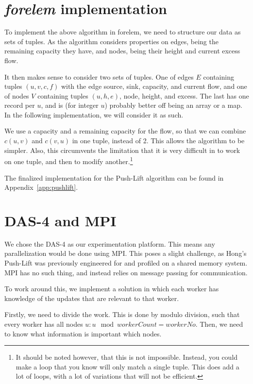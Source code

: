 \section{\textit{forelem} implementation}
\label{sec:forelem-pushlift}

To implement the above algorithm in forelem, we need to structure our data as sets of tuples. As the algorithm considers properties on edges, being the remaining capacity they have, and nodes, being their height and current excess flow.

It then makes sense to consider two sets of tuples. One of edges $E$ containing tuples $(u, v, c, f)$ with the edge source, sink, capacity, and current flow, and one of nodes $V$ containing tuples $(u, h, e)$, node, height, and excess. The last has one record per $u$, and is (for integer $u$) probably better off being an array or a map. In the following implementation, we will consider it as such.

We use a capacity and a remaining capacity for the flow, so that we can combine $c(u, v)$ and $c(v, u)$ in one tuple, instead of 2. This allows the algorithm to be simpler. Also, this circumvents the limitation that it is very difficult in \forelem to work on one tuple, and then to modify another.\footnote{It should be noted however, that this is not impossible. Instead, you could make a \forelem loop that you know will only match a single tuple. This does add a lot of loops, with a lot of variations that will not be efficient.}

The finalized implementation for the Push-Lift algorithm can be found in Appendix~\ref{app:pushlift}.

\section{DAS-4 and MPI}
\label{sec:das4}

We chose the DAS-4 as our experimentation platform. This means any parallelization would be done using MPI. This poses a slight challenge, as Hong's Push-Lift was previously engineered for and profiled on a shared memory system. MPI has no such thing, and instead relies on message passing for communication.

To work around this, we implement a solution in which each worker has knowledge of the updates that are relevant to that worker.

Firstly, we need to divide the work. This is done by modulo division, such that every worker has all nodes $u : u \mod	 workerCount = workerNo$. Then, we need to know what information is important which nodes.

